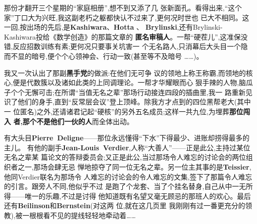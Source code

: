那份才翻开三个星期的“家庭相册”,想不到又添了几
张新面孔。看得出来,“这个家”丁口大为兴旺,我这副老朽之躯都快认不过来了,更何况时世也
已大不相同。这一回,按\dmark{}出场的先后,是\textbf{Kashiwara}、\textbf{Hotta}
、
\textbf{Brylinski},还有Brylinski-Kashiwara投给《数学创造》的那篇文章的
\textbf{匿名审稿人}。一帮“硬茬儿”,这准保没错,反应招数训练有素;更何况只要事关坑害一
个无名路人,只消幕后大头目一个隐而不显的暗号,便个个心领神会、行动一致(甚至等不及暗号
……)。

我又一次认出了那副\textbf{黑手党}的做派:在他们无可争
议的领地上称王称霸,而领地的核心,便是代数簇以及诸如此类的上同调理论。一帮才华耀眼而心
狠手辣的人物,脑瓜子个个无懈可击;在所谓“当值无名之辈”那场行动接连四段的插曲里,我一
路重新见识了他们的身手,直到“反常层会议”登上顶峰。除我方才点到的四位黑帮老大(其中一
位匿名)之外,还请诸君记起“硬核”的另外五名成员;这样一共九位,为埋葬\textbf{那位闯入
者,那个不是他们一伙的人}而全体出动。

有大头目\textbf{Pierre~Deligne}——那位永远懂得“下水”下得最少、进账却捞得最多的主儿。
有他的副手\textbf{Jean-Louis~Verdier},人称“大善人”——正是此公,主持过某位无名之辈某
篇论文的答辩委员会;又正是此公,当过那场令人难忘的讨论会的两位组织者之一,那场会肆无忌
惮地掠夺了同一位无名之辈。另一位主其事的是\textbf{Teissier},他同Verdier联名为那场令
人难忘的讨论会的令人难忘的文集,签下了那篇令人难忘的引言。跟旁人不同,他\dmark{}似乎不过
是跑了个龙套、当了个挂名替身,自己从中一无所得——唯一的乐趣,不过是讨得
他知道既有名望又毫无顾忌的那班人的欢心。最后还有\textbf{Beilinson}和\textbf{Bernstein}(对这两
位,就在这几页里
我刚刚有过一番更充分的领教),被一根根看不见的提线轻轻地牵动着……

